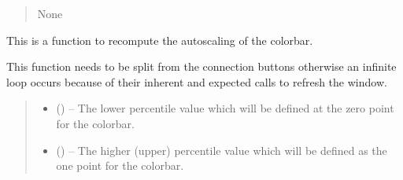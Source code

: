 \documentclass[letterpaper,11pt,english]{sphinxmanual}
\begin{document}
\begin{savenotes}
\begin{fulllineitems}
\begin{savenotes}
\begin{fulllineitems}
\begin{quote}
\begin{description}
\sphinxAtStartPar
None

\end{description}\end{quote}

\end{fulllineitems}\end{savenotes}


\begin{savenotes}\begin{fulllineitems}
\label{\detokenize{code/opihiexarata.gui.selector:opihiexarata.gui.selector.TargetSelectorWindow._recompute_colorbar_autoscale}}
\pysigstartsignatures
{}
\pysigstopsignatures
\sphinxAtStartPar
This is a function to recompute the autoscaling of the colorbar.

\sphinxAtStartPar
This function needs to be split from the connection buttons otherwise
an infinite loop occurs because of their inherent and expected calls
to refresh the window.
\begin{quote}\begin{description}
\begin{itemize}
\item {} 
\sphinxAtStartPar
{} (\sphinxstyleliteralemphasis{\sphinxupquote{, }}) – The lower percentile value which will be defined at the zero point
for the colorbar.

\item {} 
\sphinxAtStartPar
{} (\sphinxstyleliteralemphasis{\sphinxupquote{, }}) – The higher (upper) percentile value which will be defined as the
one point for the colorbar.


\end{itemize}
\end{description}
\end{quote}
\end{fulllineitems}
\end{savenotes}
\end{fulllineitems}
\end{savenotes}
\end{document}
